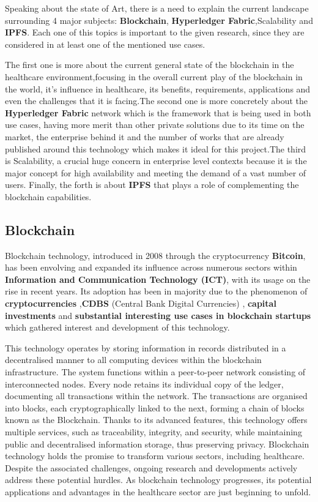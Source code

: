 Speaking about the state of Art, there is a need to explain the current landscape surrounding 4 major subjects: \textbf{Blockchain}, \textbf{Hyperledger Fabric},Scalability and \textbf{IPFS}. Each one of this topics is important to the given research, since they are considered in at least one of the mentioned use cases.

The first one is more about the current general state of the blockchain in the healthcare environment,focusing in the overall current play of the blockchain in the world, it's influence in healthcare, its benefits, requirements, applications and even the challenges that it is facing.The second one is more concretely about the \textbf{Hyperledger Fabric} network which is the framework that is being used in both use cases, having more merit than other private solutions due to its time on the market, the enterprise behind it and the number of works that are already published around this technology which makes it ideal for this project.The third is Scalability, a crucial huge concern in enterprise level contexts because it is the major concept for high availability and meeting the demand of a vast number of users. Finally, the forth is about \textbf{IPFS} that plays a role of complementing the blockchain capabilities.

\subsection{Blockchain}
Blockchain technology, introduced in 2008 through the cryptocurrency \textbf{Bitcoin}, has been envolving and expanded its influence across numerous sectors within \textbf{Information and Communication Technology (ICT)}, with its usage on the rise in recent years. Its adoption has been in majority due to the phenomenon of \textbf{cryptocurrencies} \cite{cryptocurrencies-phenomenom} ,\textbf{CDBS} (Central Bank Digital Currencies) \cite{CDBC} , \textbf{capital investments} and \textbf{substantial interesting use cases in blockchain startups} which gathered interest and development of this technology. 

This technology operates by storing information in records distributed in a decentralised manner to all computing devices within the blockchain infrastructure. The system functions within a peer-to-peer network consisting of interconnected nodes. Every node retains its individual copy of the ledger, documenting all transactions within the network. The transactions are organised into blocks, each cryptographically linked to the next, forming a chain of blocks known as the Blockchain. Thanks to its advanced features, this technology offers multiple services, such as traceability, integrity, and security, while maintaining public and decentralised information storage, thus preserving privacy.
Blockchain technology holds the promise to transform various sectors, including healthcare. Despite the associated challenges, ongoing research and developments actively address these potential hurdles. As blockchain technology progresses, its potential applications and advantages in the healthcare sector are just beginning to unfold. 

